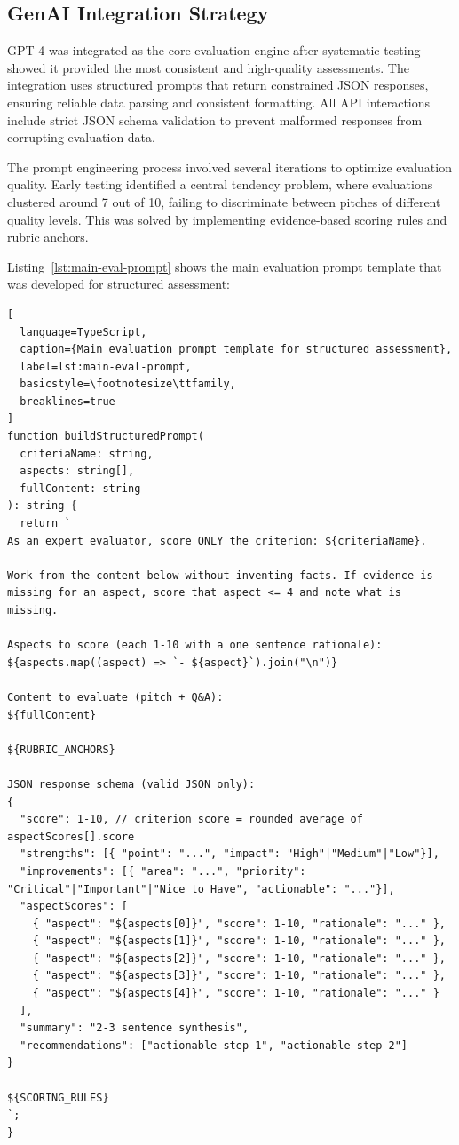 \subsection{GenAI Integration Strategy}\label{subsec:genai-integration-strategy}

GPT-4 was integrated as the core evaluation engine after systematic testing showed it provided the most consistent and high-quality assessments. The integration uses structured prompts that return constrained JSON responses, ensuring reliable data parsing and consistent formatting. All API interactions include strict JSON schema validation to prevent malformed responses from corrupting evaluation data.

The prompt engineering process involved several iterations to optimize evaluation quality. Early testing identified a central tendency problem, where evaluations clustered around 7 out of 10, failing to discriminate between pitches of different quality levels. This was solved by implementing evidence-based scoring rules and rubric anchors.

Listing~\ref{lst:main-eval-prompt} shows the main evaluation prompt template that was developed for structured assessment:

\begin{lstlisting}[
  language=TypeScript,
  caption={Main evaluation prompt template for structured assessment},
  label=lst:main-eval-prompt,
  basicstyle=\footnotesize\ttfamily,
  breaklines=true
]
function buildStructuredPrompt(
  criteriaName: string,
  aspects: string[],
  fullContent: string
): string {
  return `
As an expert evaluator, score ONLY the criterion: ${criteriaName}.

Work from the content below without inventing facts. If evidence is
missing for an aspect, score that aspect <= 4 and note what is missing.

Aspects to score (each 1-10 with a one sentence rationale):
${aspects.map((aspect) => `- ${aspect}`).join("\n")}

Content to evaluate (pitch + Q&A):
${fullContent}

${RUBRIC_ANCHORS}

JSON response schema (valid JSON only):
{
  "score": 1-10, // criterion score = rounded average of aspectScores[].score
  "strengths": [{ "point": "...", "impact": "High"|"Medium"|"Low"}],
  "improvements": [{ "area": "...", "priority": "Critical"|"Important"|"Nice to Have", "actionable": "..."}],
  "aspectScores": [
    { "aspect": "${aspects[0]}", "score": 1-10, "rationale": "..." },
    { "aspect": "${aspects[1]}", "score": 1-10, "rationale": "..." },
    { "aspect": "${aspects[2]}", "score": 1-10, "rationale": "..." },
    { "aspect": "${aspects[3]}", "score": 1-10, "rationale": "..." },
    { "aspect": "${aspects[4]}", "score": 1-10, "rationale": "..." }
  ],
  "summary": "2-3 sentence synthesis",
  "recommendations": ["actionable step 1", "actionable step 2"]
}

${SCORING_RULES}
`;
}
\end{lstlisting}

